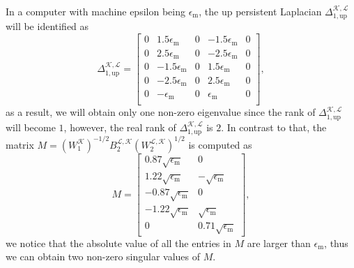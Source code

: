 \documentclass{article}
\theoremstyle{definition}
\newcommand{\KK}{\mathcal{K}}
\newcommand{\LL}{\mathcal{L}}
\newcommand{\epsmach}{\epsilon_{\text{m}}}
\begin{document}
In a computer with machine epsilon being $\epsmach$,
the up persistent Laplacian $\Delta_{1, \mathrm{up}}^{\KK, \LL}$ will be identified 
as 
\[
\Delta_{1, \mathrm{up}}^{\KK, \LL}
=
\begin{bmatrix}
0 & 1.5\epsmach & 0 & -1.5\epsmach & 0\\
0 & 2.5\epsmach & 0 & -2.5\epsmach & 0\\
0 & -1.5\epsmach & 0 & 1.5\epsmach & 0\\
0 & -2.5\epsmach & 0 & 2.5\epsmach & 0\\
0 & -\epsmach & 0 & \epsmach & 0\\
\end{bmatrix},
\]
as a result,
we will obtain only one non-zero eigenvalue since
the rank of $\Delta_{1, \mathrm{up}}^{\KK, \LL}$ will become $1$,
however,
the real rank of $\Delta_{1, \mathrm{up}}^{\KK, \LL}$ is $2$.
In contrast to that,
the matrix $M = (W_1^{\KK})^{-1/2}B_{2}^{\LL, \KK} (W_{2}^{\LL, \KK})^{1/2}$ is computed as
\[
M=
\begin{bmatrix}
0.87\sqrt{\epsmach} & 0\\
1.22\sqrt{\epsmach} & -\sqrt{\epsmach}\\
-0.87\sqrt{\epsmach} & 0\\
-1.22\sqrt{\epsmach} & \sqrt{\epsmach}\\
0 & 0.71\sqrt{\epsmach}
\end{bmatrix},
\]
we notice that the absolute value of all the entries in $M$ are larger than $\epsmach$,
thus we can obtain two non-zero singular values of $M$.
\end{document}
